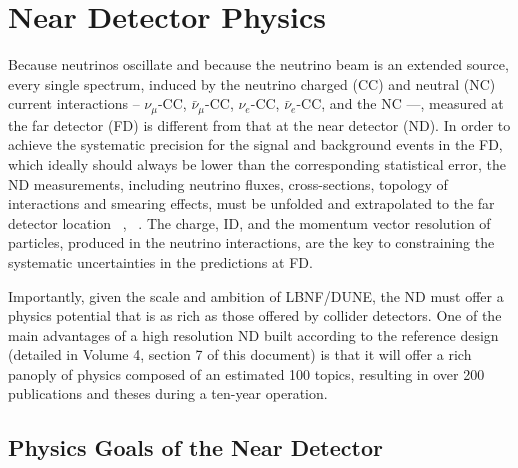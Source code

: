 
\chapter{Near Detector Physics}
\label{ch:physics-nd}

Because neutrinos oscillate and because the neutrino beam is an extended  source, every single 
spectrum,  induced by the neutrino charged (CC) and neutral (NC) current interactions -- $\nu_\mu$-CC, 
$\bar \nu_\mu$-CC, $\nu_e$-CC, $\bar \nu_e$-CC, and the NC ---, measured at the far detector (FD)  is different from that at the near 
detector (ND). 
In order to achieve the systematic precision for the signal and background events  in the FD,  
which ideally should always be lower than the corresponding statistical error, the ND 
measurements,  including neutrino fluxes,  cross-sections, topology of 
interactions and smearing effects, must be unfolded and extrapolated to the far detector location 
~\cite{ND-REQ1}, ~\cite{ND-REQ2}.  The charge, ID,  and the momentum vector resolution of 
particles, produced in the neutrino interactions,  are the key to constraining  the systematic 
uncertainties in the predictions at FD. 


Importantly, given the scale and ambition of LBNF/DUNE, the ND must offer a physics 
potential that is as rich as those offered by collider detectors. 
One of the main advantages of a high resolution ND built according to the reference design 
(detailed in Volume 4, section 7 of  this document) is that it will offer a rich panoply of physics composed 
of an estimated 100 topics,  resulting in over 200 publications and  theses during a ten-year operation. 


\section{Physics Goals of the Near Detector}
\label{sec:physics-nd-goals}

